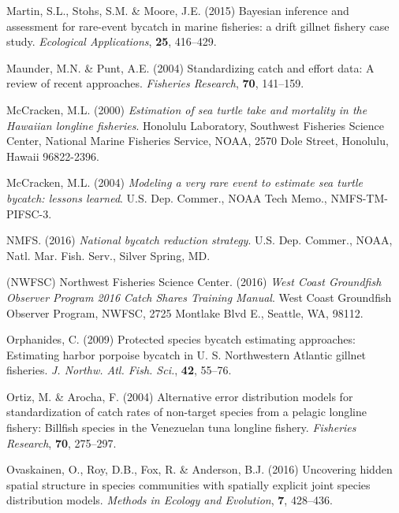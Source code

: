 \documentclass[]{article}
\begin{document}
\leavevmode\hypertarget{ref-martin2015}{}%
Martin, S.L., Stohs, S.M. \& Moore, J.E. (2015) Bayesian inference and
assessment for rare-event bycatch in marine fisheries: a drift gillnet
fishery case study. \emph{Ecological Applications}, \textbf{25},
416--429.

\leavevmode\hypertarget{ref-maunder2004}{}%
Maunder, M.N. \& Punt, A.E. (2004) Standardizing catch and effort data:
A review of recent approaches. \emph{Fisheries Research}, \textbf{70},
141--159.

\leavevmode\hypertarget{ref-mccracken2000}{}%
McCracken, M.L. (2000) \emph{Estimation of sea turtle take and mortality
in the Hawaiian longline fisheries}. Honolulu Laboratory, Southwest
Fisheries Science Center, National Marine Fisheries Service, NOAA, 2570
Dole Street, Honolulu, Hawaii 96822-2396.

\leavevmode\hypertarget{ref-mccracken2004}{}%
McCracken, M.L. (2004) \emph{Modeling a very rare event to estimate sea
turtle bycatch: lessons learned}. U.S. Dep. Commer., NOAA Tech Memo.,
NMFS-TM-PIFSC-3.

\leavevmode\hypertarget{ref-nmfs2016bycatch}{}%
NMFS. (2016) \emph{National bycatch reduction strategy}. U.S. Dep.
Commer., NOAA, Natl. Mar. Fish. Serv., Silver Spring, MD.

\leavevmode\hypertarget{ref-nwfsc2016}{}%
(NWFSC) Northwest Fisheries Science Center. (2016) \emph{West Coast
Groundfish Observer Program 2016 Catch Shares Training Manual}. West
Coast Groundfish Observer Program, NWFSC, 2725 Montlake Blvd E.,
Seattle, WA, 98112.

\leavevmode\hypertarget{ref-orphanides2009}{}%
Orphanides, C. (2009) Protected species bycatch estimating approaches:
Estimating harbor porpoise bycatch in U. S. Northwestern Atlantic
gillnet fisheries. \emph{J. Northw. Atl. Fish. Sci.}, \textbf{42},
55--76.

\leavevmode\hypertarget{ref-ortiz2004}{}%
Ortiz, M. \& Arocha, F. (2004) Alternative error distribution models for
standardization of catch rates of non-target species from a pelagic
longline fishery: Billfish species in the Venezuelan tuna longline
fishery. \emph{Fisheries Research}, \textbf{70}, 275--297.

\leavevmode\hypertarget{ref-ovaskainen2016}{}%
Ovaskainen, O., Roy, D.B., Fox, R. \& Anderson, B.J. (2016) Uncovering
hidden spatial structure in species communities with spatially explicit
joint species distribution models. \emph{Methods in Ecology and
Evolution}, \textbf{7}, 428--436.
\end{document}
